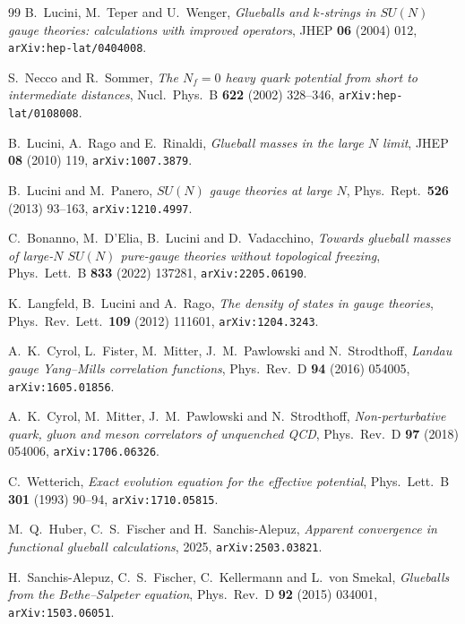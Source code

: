 \documentclass[11pt,a4paper]{article}
\theoremstyle{definition}
\theoremstyle{remark}
\begin{document}
\begin{thebibliography}{99}
B.~Lucini, M.~Teper and U.~Wenger,
\emph{Glueballs and $k$-strings in $SU(N)$ gauge theories:
calculations with improved operators},
JHEP \textbf{06} (2004) 012, \texttt{arXiv:hep-lat/0404008}.

S.~Necco and R.~Sommer,
\emph{The $N_f = 0$ heavy quark potential from short to intermediate
distances},
Nucl.\ Phys.\ B \textbf{622} (2002) 328--346,
\texttt{arXiv:hep-lat/0108008}.

B.~Lucini, A.~Rago and E.~Rinaldi,
\emph{Glueball masses in the large $N$ limit},
JHEP \textbf{08} (2010) 119, \texttt{arXiv:1007.3879}.

B.~Lucini and M.~Panero,
\emph{$SU(N)$ gauge theories at large $N$},
Phys.\ Rept.\ \textbf{526} (2013) 93--163,
\texttt{arXiv:1210.4997}.

C.~Bonanno, M.~D'Elia, B.~Lucini and D.~Vadacchino,
\emph{Towards glueball masses of large-$N$ $SU(N)$ pure-gauge theories
without topological freezing},
Phys.\ Lett.\ B \textbf{833} (2022) 137281,
\texttt{arXiv:2205.06190}.

K.~Langfeld, B.~Lucini and A.~Rago,
\emph{The density of states in gauge theories},
Phys.\ Rev.\ Lett.\ \textbf{109} (2012) 111601,
\texttt{arXiv:1204.3243}.

A.~K.~Cyrol, L.~Fister, M.~Mitter, J.~M.~Pawlowski and N.~Strodthoff,
\emph{Landau gauge Yang--Mills correlation functions},
Phys.\ Rev.\ D \textbf{94} (2016) 054005,
\texttt{arXiv:1605.01856}.

A.~K.~Cyrol, M.~Mitter, J.~M.~Pawlowski and N.~Strodthoff,
\emph{Non-perturbative quark, gluon and meson correlators of
unquenched QCD},
Phys.\ Rev.\ D \textbf{97} (2018) 054006,
\texttt{arXiv:1706.06326}.

C.~Wetterich,
\emph{Exact evolution equation for the effective potential},
Phys.\ Lett.\ B \textbf{301} (1993) 90--94,
\texttt{arXiv:1710.05815}.

M.~Q.~Huber, C.~S.~Fischer and H.~Sanchis-Alepuz,
\emph{Apparent convergence in functional glueball calculations},
2025, \texttt{arXiv:2503.03821}.

H.~Sanchis-Alepuz, C.~S.~Fischer, C.~Kellermann and L.~von Smekal,
\emph{Glueballs from the Bethe--Salpeter equation},
Phys.\ Rev.\ D \textbf{92} (2015) 034001,
\texttt{arXiv:1503.06051}.


\end{thebibliography}
\end{document}
